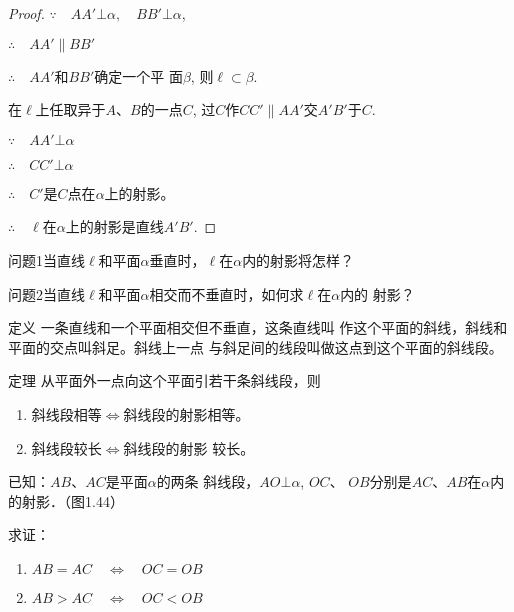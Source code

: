 \begin{proof}
  $\because\quad AA'\bot \alpha,\quad BB'\bot\alpha$,

$\therefore\quad AA'\parallel BB'$

$\therefore\quad AA'$和$BB'$确定一个平
面$\beta$, 则$\ell\subset\beta$.

在$\ell$上任取异于$A$、$B$的一点$C$, 过$C$作$CC'\parallel AA'$交$A'B'$于$C$.

$\because\quad AA'\bot \alpha$

$\therefore \quad CC'\bot\alpha$

$\therefore\quad  C'$是$C$点在$\alpha$上的射影。

$\therefore\quad \ell$在$\alpha$上的射影是直线$A'B'$.
\end{proof}

\begin{blk}
  {问题1}当直线$\ell$和平面$\alpha$垂直时，$\ell$在$\alpha$内的射影将怎样？
\end{blk}


\begin{blk}
  {问题2}当直线$\ell$和平面$\alpha$相交而不垂直时，如何求$\ell$在$\alpha$内的
射影？
\end{blk}

\begin{blk}
  {定义} 一条直线和一个平面相交但不垂直，这条直线叫
作这个平面的斜线，斜线和平面的交点叫斜足。斜线上一点
与斜足间的线段叫做这点到这个平面的斜线段。
\end{blk}

\begin{blk}
{定理} 从平面外一点向这个平面引若干条斜线段，则
\begin{enumerate}
  \item 斜线段相等$\Longleftrightarrow$斜线段的射影相等。
  \item 斜线段较长$\Longleftrightarrow$斜线段的射影
较长。
\end{enumerate}
\end{blk}


\begin{example}
  已知：$AB$、$AC$是平面$\alpha$的两条
斜线段，$AO\bot\alpha$, $OC$、
$OB$分别是$AC$、$AB$在$\alpha$内的射影．（图1.44）

求证：
\begin{enumerate}
  \item $AB=AC\quad \Longleftrightarrow \quad OC=OB$
  \item $AB>AC\quad \Longleftrightarrow \quad OC<OB$
\end{enumerate}
\end{example}

